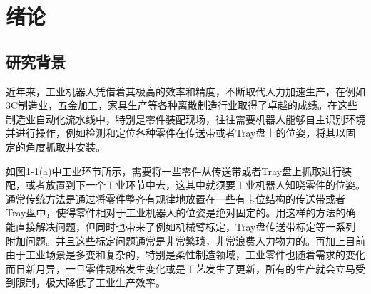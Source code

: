 \chapter{绪论}

\section{研究背景}


近年来，工业机器人凭借着其极高的效率和精度，不断取代人力加速生产，在例如3C制造业，五金加工，家具生产等各种离散制造行业取得了卓越的成绩。在这些制造业自动化流水线中，特别是零件装配现场，往往需要机器人能够自主识别环境并进行操作，例如检测和定位各种零件在传送带或者Tray盘上的位姿，将其以固定的角度抓取并安装。



如图1-1(a)中工业环节所示，需要将一些零件从传送带或者Tray盘上抓取进行装配，或者放置到下一个工业环节中去，这其中就须要工业机器人知晓零件的位姿。通常传统方法是通过将零件整齐有规律地放置在一些有卡位结构的传送带或者Tray盘中，使得零件相对于工业机器人的位姿是绝对固定的。用这样的方法的确能直接解决问题，但同时也带来了例如机械臂标定，Tray盘传送带标定等一系列附加问题。并且这些标定问题通常是非常繁琐，非常浪费人力物力的。再加上目前由于工业场景是多变和复杂的，特别是柔性制造领域，工业零件也随着需求的变化而日新月异，一旦零件规格发生变化或是工艺发生了更新，所有的生产就会立马受到限制，极大降低了工业生产效率。

